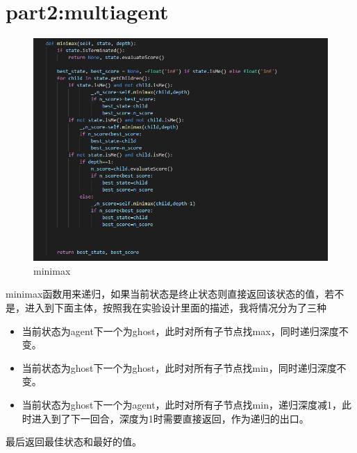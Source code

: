 \documentclass{report}
\begin{document}
    \section{part2:multiagent}
    \begin{figure}[h]
        \centering
        \includegraphics[width=15cm]{3.png}
        \caption{minimax}
    \end{figure}
    minimax函数用来递归，如果当前状态是终止状态则直接返回该状态的值，若不是，进入到下面主体，按照我在实验设计里面的描述，我将情况分为了三种
    \begin{itemize}
        \item 当前状态为agent下一个为ghost，此时对所有子节点找max，同时递归深度不变。
        \item 当前状态为ghost下一个为ghost，此时对所有子节点找min，同时递归深度不变。
        \item 当前状态为ghost下一个为agent，此时对所有子节点找min，递归深度减1，此时进入到了下一回合，深度为1时需要直接返回，作为递归的出口。
    \end{itemize}
    最后返回最佳状态和最好的值。\par 
\end{document}

